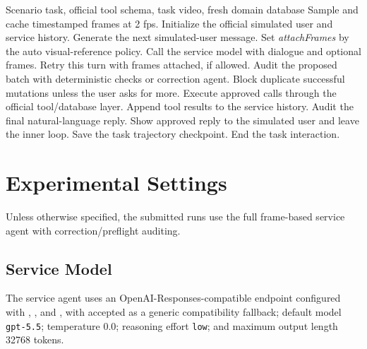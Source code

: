 \documentclass[sigconf,nonacm]{acmart}
\begin{document}
\begin{algorithm}[t]
\caption{Frame-Grounded Service-Agent Inference}
\label{alg:frame-agent}
\small
\begin{algorithmic}[1]
\Require Scenario task, official tool schema, task video, fresh domain database
\State Sample and cache timestamped frames at 2 fps.
\State Initialize the official simulated user and service history.
  \State Generate the next simulated-user message.
  \State Set \textit{attachFrames} by the auto visual-reference policy.
    \State Call the service model with dialogue and optional frames.
      \State Retry this turn with frames attached, if allowed.
      \State Audit the proposed batch with deterministic checks or correction agent.
      \State Block duplicate successful mutations unless the user asks for more.
      \State Execute approved calls through the official tool/database layer.
      \State Append tool results to the service history.
    \Else
      \State Audit the final natural-language reply.
      \State Show approved reply to the simulated user and leave the inner loop.
    \EndIf
  \EndFor
  \State Save the task trajectory checkpoint.
    \State End the task interaction.
  \EndIf
\EndFor
\end{algorithmic}
\end{algorithm}

\section{Experimental Settings}

Unless otherwise specified, the submitted runs use the full frame-based service
agent with correction/preflight auditing.

\subsection{Service Model}

The service agent uses an OpenAI-Responses-compatible endpoint configured with
, , and
, with  accepted as a generic
compatibility fallback; default model \texttt{gpt-5.5}; temperature 0.0;
reasoning effort \texttt{low}; and maximum output length 32768 tokens.
\end{document}
